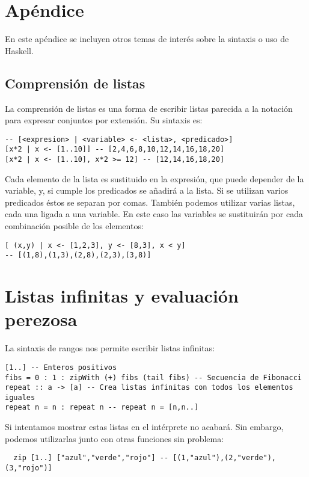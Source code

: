 \appendix

\section{Apéndice}

En este apéndice se incluyen otros temas de interés sobre la sintaxis o uso de
Haskell.

\subsection{Comprensión de listas}

La comprensión de listas es una forma de escribir listas parecida a la notación para
expresar conjuntos por extensión. Su sintaxis es:
\begin{lstlisting}
-- [<expresion> | <variable> <- <lista>, <predicado>]
[x*2 | x <- [1..10]] -- [2,4,6,8,10,12,14,16,18,20]
[x*2 | x <- [1..10], x*2 >= 12] -- [12,14,16,18,20]
\end{lstlisting}

Cada elemento de la lista es sustituido en la expresión, que puede depender de la variable, y, si
cumple los predicados se añadirá a la lista. Si se utilizan varios predicados éstos se separan por
comas. También podemos utilizar varias listas, cada una ligada a una variable. En este caso las
variables se sustituirán por cada combinación posible de los elementos:
\begin{lstlisting}
[ (x,y) | x <- [1,2,3], y <- [8,3], x < y]
-- [(1,8),(1,3),(2,8),(2,3),(3,8)]
\end{lstlisting}

\section{Listas infinitas y evaluación perezosa}
La sintaxis de rangos nos permite escribir listas infinitas:

\begin{lstlisting}
[1..] -- Enteros positivos
fibs = 0 : 1 : zipWith (+) fibs (tail fibs) -- Secuencia de Fibonacci
repeat :: a -> [a] -- Crea listas infinitas con todos los elementos iguales
repeat n = n : repeat n -- repeat n = [n,n..]
\end{lstlisting}

Si intentamos mostrar estas listas en el intérprete no acabará. Sin embargo, podemos utilizarlas
junto con otras funciones sin problema:

\begin{lstlisting}
  zip [1..] ["azul","verde","rojo"] -- [(1,"azul"),(2,"verde"),(3,"rojo")]
\end{lstlisting}

